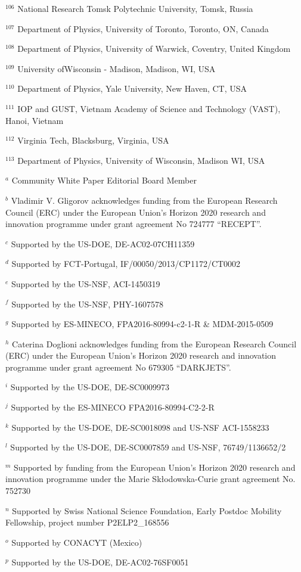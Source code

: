 \par {\footnotesize $^{106}$ National Research Tomsk Polytechnic University, Tomsk, Russia}
\par {\footnotesize $^{107}$ Department of Physics, University of Toronto, Toronto, ON, Canada}
\par {\footnotesize $^{108}$ Department of Physics, University of Warwick, Coventry, United Kingdom}
\par {\footnotesize $^{109}$ University ofWisconsin - Madison, Madison, WI, USA}
\par {\footnotesize $^{110}$ Department of Physics, Yale University, New Haven, CT, USA}
\par {\footnotesize $^{111}$ IOP and GUST, Vietnam Academy of Science and Technology (VAST), Hanoi, Vietnam}
\par {\footnotesize $^{112}$ Virginia Tech, Blacksburg, Virginia, USA}
\par {\footnotesize $^{113}$ Department of Physics, University of Wisconsin, Madison WI, USA}
\bigskip
\par {\footnotesize $^{a}$ Community White Paper Editorial Board Member}
\par {\footnotesize $^{b}$ Vladimir V. Gligorov acknowledges funding from the European Research Council (ERC) under the European Union's Horizon 2020 research and innovation programme under grant agreement No 724777 “RECEPT”.}
\par {\footnotesize $^{c}$ Supported by the US-DOE, DE-AC02-07CH11359}
\par {\footnotesize $^{d}$ Supported by FCT-Portugal, IF/00050/2013/CP1172/CT0002}
\par {\footnotesize $^{e}$ Supported by the US-NSF, ACI-1450319}
\par {\footnotesize $^{f}$ Supported by the US-NSF, PHY-1607578}
\par {\footnotesize $^{g}$ Supported by ES-MINECO, FPA2016-80994-c2-1-R \& MDM-2015-0509}
\par {\footnotesize $^{h}$ Caterina Doglioni acknowledges funding from the European Research Council (ERC) under the European Union's Horizon 2020 research and innovation programme under grant agreement No 679305 “DARKJETS”.}
\par {\footnotesize $^{i}$ Supported by the US-DOE, DE-SC0009973}
\par {\footnotesize $^{j}$ Supported by the ES-MINECO FPA2016-80994-C2-2-R}
\par {\footnotesize $^{k}$ Supported by the US-DOE, DE-SC0018098 and US-NSF ACI-1558233}
\par {\footnotesize $^{l}$ Supported by the US-DOE, DE-SC0007859 and US-NSF, 76749/1136652/2}
\par {\footnotesize $^{m}$ Supported by funding from the European Union’s Horizon 2020 research and innovation programme under the Marie Skłodowska-Curie grant agreement No. 752730}
\par {\footnotesize $^{n}$ Supported by Swiss National Science Foundation, Early Postdoc Mobility Fellowship, project number P2ELP2\_168556}
\par {\footnotesize $^{o}$ Supported by CONACYT (Mexico)}
\par {\footnotesize $^{p}$ Supported by the US-DOE, DE-AC02-76SF0051}
